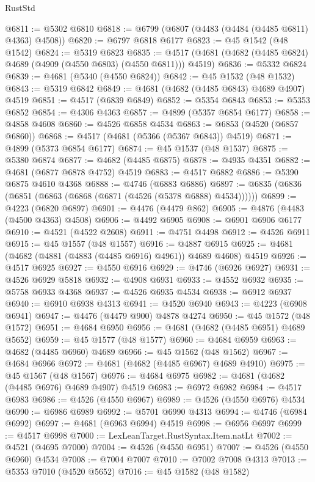 \begin{lexlean}{RustStd}
\begin{coremodule}
@6811 := @5302 @6810
@6818 := @6799 (@6807 (@4483 (@4484 (@4485 @6811) @4363) @4508))
@6820 := @6797 @6818 @6177
@6823 := @45 @1542 (@48 @1542)
@6824 := @5319 @6823
@6835 := @4517 (@4681 (@4682 (@4485 @6824) @4689 (@4909 (@4550 @6803) (@4550 @6811))) @4519)
@6836 := @5332 @6824
@6839 := @4681 (@5340 (@4550 @6824))
@6842 := @45 @1532 (@48 @1532)
@6843 := @5319 @6842
@6849 := @4681 (@4682 (@4485 @6843) @4689 @4907) @4519
@6851 := @4517 (@6839 @6849)
@6852 := @5354 @6843
@6853 := @5353 @6852
@6854 := @4306 @4363
@6857 := @4899 (@5357 @6854 @6177)
@6858 := @4858 @4608
@6860 := @4526 @6858 @4534
@6863 := @6853 (@4520 (@6857 @6860))
@6868 := @4517 (@4681 (@5366 (@5367 @6843)) @4519)
@6871 := @4899 (@5373 @6854 @6177)
@6874 := @45 @1537 (@48 @1537)
@6875 := @5380 @6874
@6877 := @4682 (@4485 @6875)
@6878 := @4935 @4351
@6882 := @4681 (@6877 @6878 @4752) @4519
@6883 := @4517 @6882
@6886 := @5390 @6875 @4610 @4368
@6888 := @4746 (@6883 @6886)
@6897 := @6835 (@6836 (@6851 (@6863 (@6868 (@6871 (@4526 (@5378 @6888) @4534))))))
@6899 := @4223 (@6820 @6897)
@6901 := @4476 (@4479 @862)
@6905 := @4876 (@4483 (@4500 @4363) @4508)
@6906 := @4492 @6905
@6908 := @6901 @6906 @6177
@6910 := @4521 (@4522 @2608)
@6911 := @4751 @4498
@6912 := @4526 @6911
@6915 := @45 @1557 (@48 @1557)
@6916 := @4887 @6915
@6925 := @4681 (@4682 (@4881 (@4883 (@4485 @6916) @4961)) @4689 @4608) @4519
@6926 := @4517 @6925
@6927 := @4550 @6916
@6929 := @4746 (@6926 @6927)
@6931 := @4526 @6929 @5818
@6932 := @4908 @6931
@6933 := @4552 @6932
@6935 := @5758 @6933 @4368
@6937 := @4526 @6935 @4534
@6938 := @6912 @6937
@6940 := @6910 @6938 @4313
@6941 := @4520 @6940
@6943 := @4223 (@6908 @6941)
@6947 := @4476 (@4479 @900) @4878 @4274
@6950 := @45 @1572 (@48 @1572)
@6951 := @4684 @6950
@6956 := @4681 (@4682 (@4485 @6951) @4689 @5652)
@6959 := @45 @1577 (@48 @1577)
@6960 := @4684 @6959
@6963 := @4682 (@4485 @6960) @4689
@6966 := @45 @1562 (@48 @1562)
@6967 := @4684 @6966
@6972 := @4681 (@4682 (@4485 @6967) @4689 @4910)
@6975 := @45 @1567 (@48 @1567)
@6976 := @4684 @6975
@6982 := @4681 (@4682 (@4485 @6976) @4689 @4907) @4519
@6983 := @6972 @6982
@6984 := @4517 @6983
@6986 := @4526 (@4550 @6967)
@6989 := @4526 (@4550 @6976) @4534
@6990 := @6986 @6989
@6992 := @5701 @6990 @4313
@6994 := @4746 (@6984 @6992)
@6997 := @4681 (@6963 @6994) @4519
@6998 := @6956 @6997
@6999 := @4517 @6998
@7000 := LexLeanTarget.RustSyntax.Item.natLt
@7002 := @4521 (@4695 @7000)
@7004 := @4526 (@4550 @6951)
@7007 := @4526 (@4550 @6960) @4534
@7008 := @7004 @7007
@7010 := @7002 @7008 @4313
@7013 := @5353 @7010 (@4520 @5652)
@7016 := @45 @1582 (@48 @1582)

\end{coremodule}
\end{lexlean}
